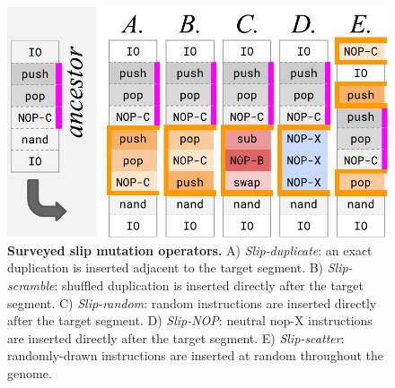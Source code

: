 \begin{figure}[!ht]
  \centering
  \includegraphics[width=0.8\linewidth]{imgs/GeneDupeOps.pdf}
    \caption{
    \textbf{Surveyed slip mutation operators.}
    A) \textit{Slip-duplicate}: an exact duplication is inserted adjacent to the target segment.
    B) \textit{Slip-scramble}: shuffled duplication is inserted directly after the target segment.
    C) \textit{Slip-random}: random instructions are inserted directly after the target segment.
    D) \textit{Slip-NOP}: neutral nop-X instructions are inserted directly after the target segment.
    E) \textit{Slip-scatter}: randomly-drawn instructions are inserted at random throughout the genome.
    }
    \label{fig:slip_mut_variants}
\end{figure}
